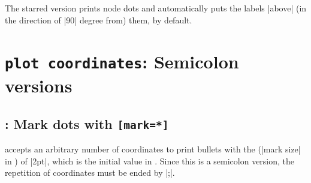 \begin{tzcode}{.3}
\end{tzcode}

\subsection{\protect\cmd{\tzcoorsquick*}}
\label{ssi:tzcoorsquick*}

The starred version \icmd{\tzcoorsquick*} prints node dots and automatically puts the labels |above| (in the direction of |90| degree from) them, by default.

\begin{tzcode}{.3}
\end{tzcode}


\section{\texttt{plot coordinates}: Semicolon versions}
\label{si:plotcoordinates}

\subsection{\protect\cmd{\tzplot*}: Mark dots with \texttt{[mark=*]}}
\label{ssi:tzplot*}

\icmd{\tzplot*} accepts an arbitrary number of coordinates to print bullets with the  (|mark size| in \Tikz) of |2pt|, which is the initial value in \Tikz. Since this is a semicolon version, the repetition of coordinates must be ended by |;|.

\begin{tzcode}{.3}
\end{tzcode}


